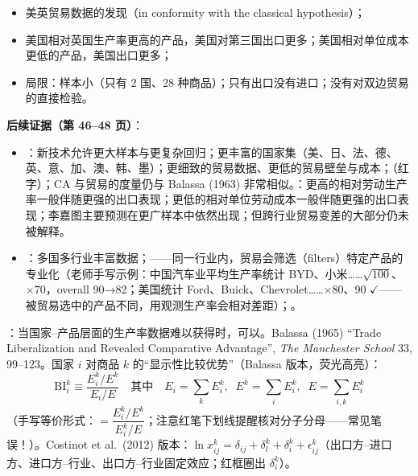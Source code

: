 \begin{thmbox}
\begin{itemize}
  \item 美英贸易数据的发现（in conformity with the classical hypothesis）；
  \item 美国相对英国生产率更高的产品，美国对第三国出口更多；美国相对单位成本更低的产品，美国出口更多；
  \item 局限：样本小（只有 2 国、28 种商品）；只有出口没有进口；没有对双边贸易的直接检验。
\end{itemize}
\end{thmbox}

\textbf{后续证据（第 46--48 页）}：
\begin{itemize}
  \item {}：新技术允许更大样本与更复杂回归；更丰富的国家集（美、日、法、德、英、意、加、澳、韩、墨）；更细致的贸易数据、更低的贸易壁垒与成本；（红字）；CA 与贸易的度量仍与 Balassa (1963) 非常相似。：更高的相对劳动生产率一般伴随更强的出口表现；更低的相对单位劳动成本一般伴随更强的出口表现；李嘉图主要预测在更广样本中依然出现；但跨行业贸易变差的大部分仍未被解释。
  \item {}：多国多行业丰富数据；——同一行业内，贸易会筛选（filters）特定产品的专业化（老师手写示例：中国汽车业平均生产率统计 BYD、小米……$\sqrt{100}$、$\times 70$，overall 90→82；美国统计 Ford、Buick、Chevrolet……$\times 80$、90 $\checkmark$——被贸易选中的产品不同，用观测生产率会相对差距）；。
\end{itemize}


\begin{defbox}[显示性比较优势（第 50--51 页）]
：当国家--产品层面的生产率数据难以获得时，可以。Balassa (1965) ``Trade Liberalization and Revealed Comparative Advantage'', \textit{The Manchester School} 33, 99--123。国家 $i$ 对商品 $k$ 的``显示性比较优势''（Balassa 版本，荧光高亮）：
\[
\mathrm{BI}_i^k \equiv \frac{E_i^k / E^k}{E_i / E}
\quad\text{其中}\quad
E_i = \sum_k E_i^k,\;\; E^k = \sum_i E_i^k,\;\; E = \sum_{i,k} E_i^k
\]
（手写等价形式：$= \dfrac{E_i^k / E^k}{E^k_i / E}$；注意红笔下划线提醒核对分子分母——常见笔误！）。Costinot et al.\ (2012) 版本：$\ln x_{ij}^k = \delta_{ij} + \delta_l^k + \delta_i^k + \epsilon_{ij}^k$（出口方--进口方、进口方--行业、出口方--行业固定效应；红框圈出 $\delta_i^k$）。
\end{defbox}


